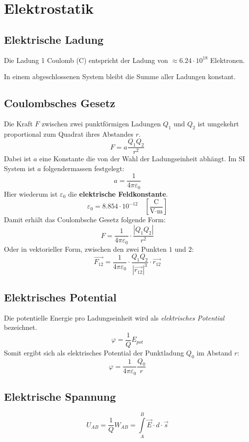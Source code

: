 \section{Elektrostatik}

\subsection{Elektrische Ladung}

Die Ladung 1 Coulomb (C) entspricht der Ladung von $\approx 6.24 \cdot 10^{18}$
Elektronen.

In einem abgeschlossenen System bleibt die Summe aller Ladungen konstant.

\subsection{Coulombsches Gesetz}

Die Kraft $F$ zwischen zwei punktförmigen Ladungen $Q_1$ und $Q_2$ ist umgekehrt
proportional zum Quadrat ihres Abstandes $r$.
\[
	F = a \frac{Q_1Q_2}{r^2}
\]
Dabei ist $a$ eine Konstante die von der Wahl der Ladungseinheit abhängt. Im SI
System ist $a$ folgendermassen festgelegt:
\[
	a = \frac{1}{4 \pi \varepsilon_0}
\]
Hier wiederum ist $\varepsilon_0$ die \textbf{elektrische Feldkonstante}.
\[
	\varepsilon_0 = 8.854 \cdot 10^{-12}
	\quad \left[ \frac{\textrm{C}}{\textrm{V}\cdot \textrm{m}} \right]
\]
Damit erhält das Coulombsche Gesetz folgende Form:
\[
	F = \frac{1}{4\pi\varepsilon_0} \cdot \frac{|Q_1Q_2|}{r^2}
\]
Oder in vektorieller Form, zwischen den zwei Punkten $1$ und $2$:
\[
	\vec{F_{12}} = \frac{1}{4\pi\varepsilon_0}
	\cdot \frac{Q_1Q_2}{|\vec{r_{12}}|^3}
	\cdot \vec{r_{12}}
\]

\subsection{Elektrisches Potential}

Die potentielle Energie pro Ladungseinheit wird als \textit{elektrisches
Potential} bezeichnet.
\[
	\varphi = \frac{1}{Q} E_{pot}
\]
Somit ergibt sich als elektrisches Potential der Punktladung $Q_0$ im Abstand $r$:
\[
	\varphi = \frac{1}{4\pi\varepsilon_0} \frac{Q_0}{r}
\]

\subsection{Elektrische Spannung}
\[
	U_{AB} = \frac{1}{Q} W_{AB} = \int\limits^B_A \vec{E} \cdot d \cdot \vec{s}
\]

